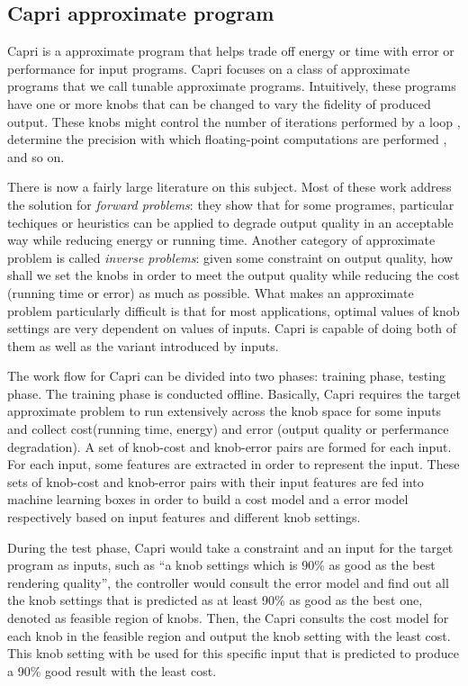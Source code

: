   \subsection{Capri approximate program}
  \label{sec:Capri_intro}
  Capri is a approximate program that helps trade off energy or time with error
  or performance for input programs. Capri focuses on a class of approximate
  programs that we call tunable approximate programs. Intuitively, these
  programs have one or more knobs that can be changed to vary the fidelity of
  produced output. These knobs might control the number of iterations performed
  by a loop \cite{}, determine the precision with which floating-point
  computations are performed \cite{}, and so on.

  There is now a fairly large literature on this subject. Most of these work
  address the solution for \emph{forward problems}: they show that for some
  programes, particular techiques or heuristics can be applied to degrade
  output quality in an acceptable way while reducing energy or running time.
  Another category of approximate problem is called \emph{
  inverse problems}: given some constraint on output quality, how shall we set
  the knobs in order to meet the output quality while reducing the cost (running
  time or error) as much as possible. What makes an approximate problem
  particularly difficult is that for most applications, optimal values of
  knob settings are very dependent on values of inputs. Capri is capable of
  doing both of them as well as the variant introduced by inputs.

  The work flow for Capri can be divided into two phases: training
  phase, testing phase. The training phase is conducted
  offline. Basically, Capri requires the target approximate problem to run
  extensively across the knob space for some inputs and collect cost(running
  time, energy) and error (output quality or perfermance degradation). A set of
  knob-cost and knob-error pairs are formed for each input. For each input, some
  features are extracted in order to represent the input. These sets of
  knob-cost and knob-error pairs with their input features are fed into
  machine learning boxes in order to build a cost model and a error model
  respectively based on input features and different knob settings.

  During the test phase, Capri would take a
  constraint and an input for the target program as inputs, such as ``a knob
  settings which is 90\% as good as the best rendering quality'', the
  controller would consult the error model and find out
  all the knob settings that is predicted as at least 90\% as good as the best
  one, denoted as feasible region of knobs. Then, the Capri consults the
  cost model for each knob in the feasible region and output the knob setting
  with the least cost. This knob setting with be used for this specific input
  that is predicted to produce a 90\% good result with the least cost.

